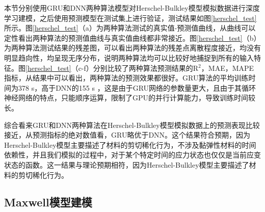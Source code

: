 本节分别使用GRU和DNN两种算法模型对Herschel-Bulkley模型模拟数据进行深度学习建模，之后使用预测模型在测试集上进行验证，测试结果如图\ref{herschel_test}所示。图\ref{herschel_test}（a）为两种算法测试的真实值-预测值曲线，从曲线可以定性看出两种算法的预测值曲线与真实值曲线都非常接近。图\ref{herschel_test}（b）为两种算法测试结果的残差图，可以看出两种算法的残差点离散程度接近，均没有明显趋向性，均呈现无序分布，说明两种算法均可以比较好地捕捉到所有的输入特征。图\ref{herschel_test}（c-f）分别比较了两种算法预测结果的R$^2$，MAE，MAPE指标，从结果中可以看出，两种算法的预测效果都很好。GRU算法的平均训练时间为378 s，高于DNN的155 s ，这是由于GRU网络的参数量更大，且由于其循环神经网络的特点，只能顺序运算，限制了GPU的并行计算能力，导致训练时间较长。


综合看来GRU和DNN两种算法在Herschel-Bulkley模型模拟数据上的预测表现比较接近，从预测指标的绝对数值看，GRU略优于DNN。这个结果符合预期，因为Herschel-Bulkley模型主要描述了材料的剪切稀化行为，不涉及黏弹性材料的时间依赖性，并且我们模拟的过程中，对于某个特定时间的应力状态也仅仅是当前应变状态的函数。这一结果与理论预期相符，因为Herschel-Bulkley模型主要描述了材料的剪切稀化行为。

\subsection{Maxwell模型建模}

